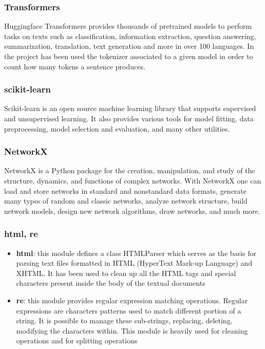 \documentclass[\main/main.tex]{subfiles}
\begin{document}
\subsubsection{Transformers}
Huggingface Transformers provides thousands of pretrained models to perform tasks on texts such as classification, information extraction, question answering, summarization, translation, text generation and more in over 100 languages. In the project has been used the tokenizer associated to a given model in order to count how many tokens a sentence produces. 
\subsubsection{scikit-learn}
Scikit-learn is an open source machine learning library that supports supervised and unsupervised learning. It also provides various tools for model fitting, data preprocessing, model selection and evaluation, and many other utilities.
\cite{scikit-learn}
\subsubsection{NetworkX}
NetworkX is a Python package for the creation, manipulation, and study of the structure, dynamics, and functions of complex networks. With NetworkX one can load and store networks in standard and nonstandard data formats, generate many types of random and classic networks, analyze network structure, build network models, design new network algorithms, draw networks, and much more.
\cite{SciPyProceedings_11}
\subsubsection{html, re}
\begin{itemize}
    \item \textbf{html}: this module defines a class HTMLParser which serves as the basis for parsing text files formatted in HTML (HyperText Mark-up Language) and XHTML. It has been used to clean up all the HTML tags and special characters present inside the body of the textual documents
    \item \textbf{re}: this module provides regular expression matching operations. Regular expressions are characters patterns used to match different portion of a string. It is possible to manage these sub-strings, replacing, deleting, modifying the characters within. This module is heavily used for cleaning operations and for splitting operations
\end{itemize}
\end{document}
